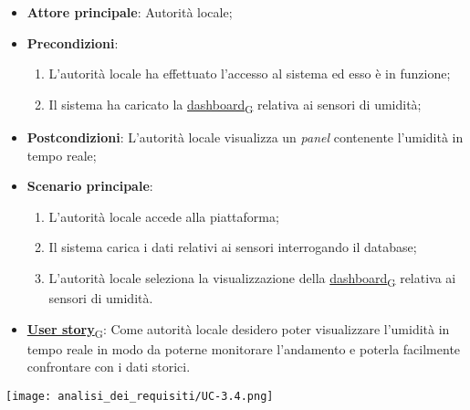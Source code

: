 \begin{itemize}
	\item \textbf{Attore principale}: Autorità locale;
	\item \textbf{Precondizioni}:
	      \begin{enumerate}
		      \item L'autorità locale ha effettuato l'accesso al sistema ed esso è in funzione;
		      \item Il sistema ha caricato la \href{https://7last.github.io/docs/rtb/documentazione-interna/glossario\#dashboard}{dashboard\textsubscript{G}} relativa ai sensori di umidità;
	      \end{enumerate}
	\item \textbf{Postcondizioni}: L'autorità locale visualizza un \textit{panel} contenente l'umidità in tempo reale;
	\item \textbf{Scenario principale}:
	      \begin{enumerate}
		      \item L'autorità locale accede alla piattaforma;
		      \item Il sistema carica i dati relativi ai sensori interrogando il database;
		      \item L'autorità locale seleziona la visualizzazione della \href{https://7last.github.io/docs/rtb/documentazione-interna/glossario\#dashboard}{dashboard\textsubscript{G}} relativa ai sensori di umidità.
	      \end{enumerate}
	\item \href{https://7last.github.io/docs/rtb/documentazione-interna/glossario\#user-story}{\textbf{User story}\textsubscript{G}}:
	      Come autorità locale desidero poter visualizzare l'umidità in tempo reale in modo da poterne monitorare l'andamento
	      e poterla facilmente confrontare con i dati storici.
\end{itemize}
\begin{center}
	\texttt{[image: analisi\_dei\_requisiti/UC-3.4.png]}
\end{center}

